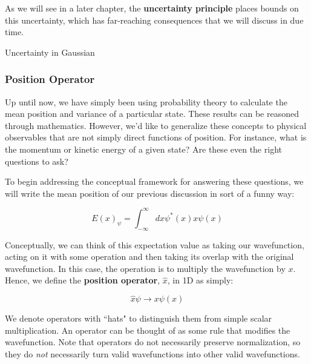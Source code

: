 As we will see in a later chapter, the \textbf{uncertainty principle} places bounds on this uncertainty, which has far-reaching consequences that we will discuss in due time. 

\begin{example}
	Uncertainty in Gaussian
\end{example}
\subsubsection{Position Operator}

Up until now, we have simply been using probability theory to calculate the mean position and variance of a particular state. These results can be reasoned through mathematics. However, we'd like to generalize these concepts to physical observables that are not simply direct functions of position. For instance, what is the momentum or kinetic energy of a given state? Are these even the right questions to ask? 

To begin addressing the conceptual framework for answering these questions, we will write the mean position of our previous discussion in sort of a funny way:

\begin{equation}
	E(x)_{\psi} = \int_{-\infty}^{\infty}dx \psi^*(x) x \psi(x) \label{eq: expect}
\end{equation}

Conceptually, we can think of this expectation value as taking our wavefunction, acting on it with some operation and then taking its overlap with the original wavefunction. In this case, the operation is to multiply the wavefunction by $x$. Hence, we define the \textbf{position operator}, $\hat{x}$, in 1D as simply:

\begin{equation}
	\hat{x}\psi \to x\psi(x)
\end{equation}

We denote operators with ``hats" to distinguish them from simple scalar multiplication. An operator can be thought of as some rule that modifies the wavefunction. Note that operators do not necessarily preserve normalization, so they do \textit{not} necessarily turn valid wavefunctions into other valid wavefunctions. 

